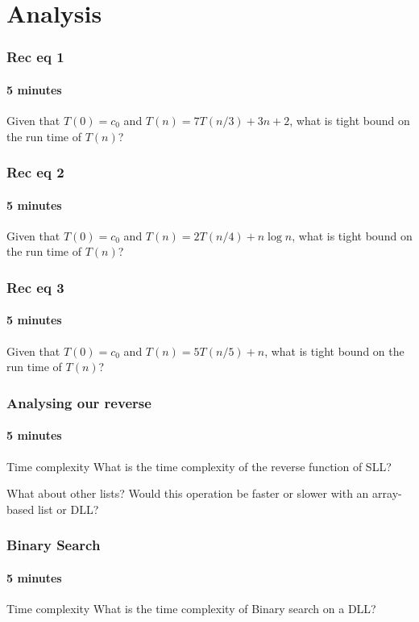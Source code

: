 \section{Analysis}
\label{sec:analysis}

\begin{frame}
	\frametitle{Rec eq 1}
	\framesubtitle{5 minutes}
	\begin{problemblock}{}
		Given that $T(0) = c_0$ and $T(n) = 7T(n/3) + 3n + 2$, what is tight bound on the run time of $T(n)$?
	\end{problemblock}
\end{frame}

\begin{frame}
	\frametitle{Rec eq 2}
	\framesubtitle{5 minutes}
	\begin{problemblock}{}
		Given that $T(0) = c_0$ and $T(n) = 2T(n/4) + n \log n$, what is tight bound on the run time of $T(n)$?
	\end{problemblock}
\end{frame}

\begin{frame}
	\frametitle{Rec eq 3}
	\framesubtitle{5 minutes}
	\begin{problemblock}{}
		Given that $T(0) = c_0$ and $T(n) = 5T(n/5) + n$, what is tight bound on the run time of $T(n)$?
	\end{problemblock}
\end{frame}

\begin{frame}
	\frametitle{Analysing our reverse}
	\framesubtitle{5 minutes}
	\begin{problemblock}{Time complexity}
		What is the time complexity of the reverse function of SLL?
	\end{problemblock}
	\pause
	\begin{questionblock}{What about other lists?}
		Would this operation be faster or slower with an array-based list or DLL?
	\end{questionblock}
\end{frame}

\begin{frame}
	\frametitle{Binary Search}
	\framesubtitle{5 minutes}
	\begin{problemblock}{Time complexity}
		What is the time complexity of Binary search on a DLL?
	\end{problemblock}
\end{frame}
